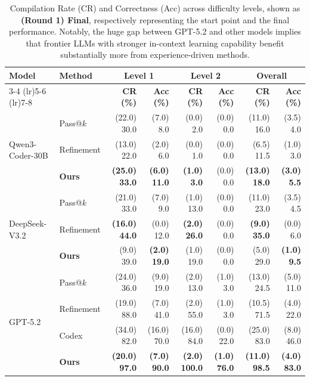 \documentclass{article} %
\theoremstyle{definition}
\theoremstyle{remark}
\begin{document}
\begin{table}[!t]
\centering

\caption{Compilation Rate (CR) and Correctness (Acc) across difficulty levels, shown as \textbf{(Round 1) Final}, respectively representing the start point and the final performance. Notably, the huge gap between GPT-5.2 and other models implies that frontier LLMs with stronger in-context learning capability benefit substantially more from experience-driven methods. }
    \label{tab:main_results}

    \setlength{\tabcolsep}{4pt}
    \renewcommand{\arraystretch}{1.5}

\begin{tabular}{ll rr rr rr}
      \toprule
\multirow{2}{*}{\textbf{Model}} & \multirow{2}{*}{\textbf{Method}} & \multicolumn{2}{c}{\textbf{Level 1}} & \multicolumn{2}{c}{\textbf{Level 2}} & \multicolumn{2}{c}{\textbf{Overall}} \\
\cmidrule(lr){3-4} \cmidrule(lr){5-6} \cmidrule(lr){7-8}
& & \textbf{CR (\%)} & \textbf{Acc (\%)} & \textbf{CR (\%)} & \textbf{Acc (\%)} & \textbf{CR (\%)} & \textbf{Acc (\%)} \\
      \midrule
\multirow{3}{*}{Qwen3-Coder-30B}
& Pass@$k$ & (22.0) 30.0 & (7.0) 8.0 & (0.0) 2.0 & (0.0) 0.0 & (11.0) 16.0 & (3.5) 4.0 \\
& Refinement & (13.0) 22.0 & (2.0) 6.0 & (0.0) 1.0 & (0.0) 0.0 & (6.5) 11.5 & (1.0) 3.0 \\
& \textbf{Ours} & \textbf{(25.0) 33.0} & \textbf{(6.0) 11.0} & \textbf{(1.0) 3.0} & (0.0) 0.0 & \textbf{(13.0) 18.0} & \textbf{(3.0) 5.5} \\
      \midrule
\multirow{3}{*}{DeepSeek-V3.2}
& Pass@$k$ & (21.0) 33.0 & (7.0) 9.0 & (1.0) 13.0 & (0.0) 0.0 & (11.0) 23.0 & (3.5) 4.5 \\
& Refinement & \textbf{(16.0) 44.0} & (0.0) 12.0 & \textbf{(2.0) 26.0} & (0.0) 0.0 & \textbf{(9.0) 35.0} & (0.0) 6.0 \\
& \textbf{Ours} & (9.0) 39.0 & \textbf{(2.0) 19.0} & (1.0) 19.0 & (0.0) 0.0 & (5.0) 29.0 & \textbf{(1.0) 9.5} \\
      \midrule
\multirow{4}{*}{GPT-5.2}
& Pass@$k$ & (24.0) 36.0 & (9.0) 19.0 & (2.0) 13.0 & (1.0) 3.0 & (13.0) 24.5 & (5.0) 11.0 \\
& Refinement & (19.0) 88.0 & (7.0) 41.0 & (2.0) 55.0 & (1.0) 3.0 & (10.5) 71.5 & (4.0) 22.0 \\
& Codex & (34.0) 82.0 & (16.0) 70.0 & (16.0) 84.0 & (0.0) 22.0 & (25.0) 83.0 & (8.0) 46.0 \\
& \textbf{Ours} & \textbf{(20.0) 97.0} & \textbf{(7.0) 90.0} & \textbf{(2.0) 100.0} & \textbf{(1.0) 76.0} & \textbf{(11.0) 98.5} & \textbf{(4.0) 83.0} \\
      \bottomrule
    \end{tabular}
  \end{table}
\end{document}
